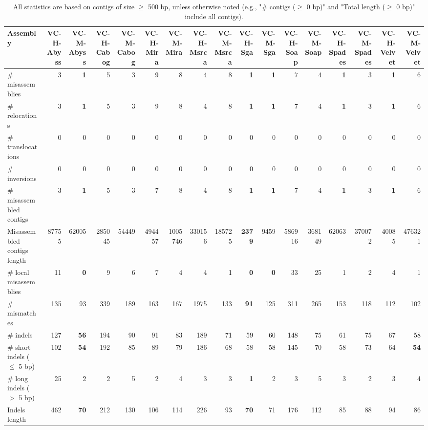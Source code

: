 \documentclass[12pt,a4paper]{article}
\begin{document}
\begin{table}[ht]
\begin{center}
\caption{All statistics are based on contigs of size $\geq$ 500 bp, unless otherwise noted (e.g., "\# contigs ($\geq$ 0 bp)" and "Total length ($\geq$ 0 bp)" include all contigs).}
\begin{tabular}{|l*{16}{|r}|}
\hline
Assembly & VC-H-Abyss & VC-M-Abyss & VC-H-Cabog & VC-M-Cabog & VC-H-Mira & VC-M-Mira & VC-H-Msrca & VC-M-Msrca & VC-H-Sga & VC-M-Sga & VC-H-Soap & VC-M-Soap & VC-H-Spades & VC-M-Spades & VC-H-Velvet & VC-M-Velvet \\ \hline
\# misassemblies & 3 & {\bf 1} & 5 & 3 & 9 & 8 & 4 & 8 & {\bf 1} & {\bf 1} & 7 & 4 & {\bf 1} & 3 & {\bf 1} & 6 \\ \hline
\hspace{5mm}\# relocations & 3 & {\bf 1} & 5 & 3 & 9 & 8 & 4 & 8 & {\bf 1} & {\bf 1} & 7 & 4 & {\bf 1} & 3 & {\bf 1} & 6 \\ \hline
\hspace{5mm}\# translocations & 0 & 0 & 0 & 0 & 0 & 0 & 0 & 0 & 0 & 0 & 0 & 0 & 0 & 0 & 0 & 0 \\ \hline
\hspace{5mm}\# inversions & 0 & 0 & 0 & 0 & 0 & 0 & 0 & 0 & 0 & 0 & 0 & 0 & 0 & 0 & 0 & 0 \\ \hline
\# misassembled contigs & 3 & {\bf 1} & 5 & 3 & 7 & 8 & 4 & 8 & {\bf 1} & {\bf 1} & 7 & 4 & {\bf 1} & 3 & {\bf 1} & 6 \\ \hline
Misassembled contigs length & 87755 & 62005 & 285045 & 54449 & 494457 & 1005746 & 330156 & 185725 & {\bf 2379} & 9459 & 586916 & 368149 & 62063 & 370072 & 40085 & 476321 \\ \hline
\# local misassemblies & 11 & {\bf 0} & 9 & 6 & 7 & 4 & 4 & 1 & {\bf 0} & {\bf 0} & 33 & 25 & 1 & 2 & 4 & 1 \\ \hline
\# mismatches & 135 & 93 & 339 & 189 & 163 & 167 & 1975 & 133 & {\bf 91} & 125 & 311 & 265 & 153 & 118 & 112 & 102 \\ \hline
\# indels & 127 & {\bf 56} & 194 & 90 & 91 & 83 & 189 & 71 & 59 & 60 & 148 & 75 & 61 & 75 & 67 & 58 \\ \hline
\hspace{5mm}\# short indels ($\leq$ 5 bp) & 102 & {\bf 54} & 192 & 85 & 89 & 79 & 186 & 68 & 58 & 58 & 145 & 70 & 58 & 73 & 64 & {\bf 54} \\ \hline
\hspace{5mm}\# long indels ($>$ 5 bp) & 25 & 2 & 2 & 5 & 2 & 4 & 3 & 3 & {\bf 1} & 2 & 3 & 5 & 3 & 2 & 3 & 4 \\ \hline
Indels length & 462 & {\bf 70} & 212 & 130 & 106 & 114 & 226 & 93 & {\bf 70} & 71 & 176 & 112 & 85 & 88 & 94 & 86 \\ \hline
\end{tabular}
\end{center}
\end{table}
\end{document}
